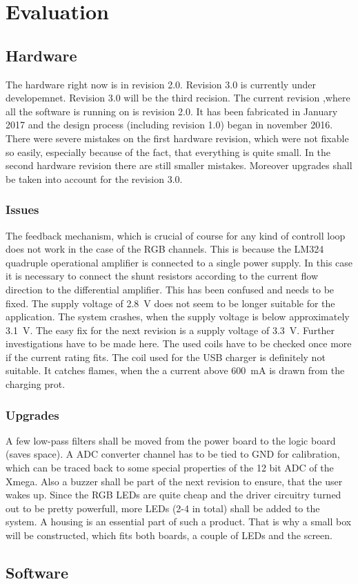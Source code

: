 \chapter{Evaluation}
\label{chap:evaluation}
\section{Hardware}
The hardware right now is in revision 2.0. Revision 3.0 is currently under
developemnet. Revision 3.0 will be the third recision. The current revision
,where all the software is running on is revision 2.0. It has been fabricated in
January 2017 and the design process (including revision 1.0) began in november
2016. There were severe mistakes on the first hardware revision, which were not
fixable so easily, especially because of the fact, that everything is quite
small. In the second hardware revision there are still smaller mistakes.
Moreover upgrades shall be taken into account for the revision 3.0. 

\subsection{Issues}
\label{subsec:issues}
The feedback mechanism, which is crucial of course for any kind of controll loop
does not work in the case of the RGB channels. This is because the LM324
quadruple operational amplifier is connected to a single power supply. In this
case it is necessary to connect the shunt resistors according to the current
flow direction to the differential amplifier. This has been confused and needs
to be fixed. 
\newpar
The supply voltage of \SI{2.8}{\volt} does not seem to be longer suitable for the
application. The system crashes, when the supply voltage is below approximately
\SI{3.1}{\volt}. The easy fix for the next revision is a supply voltage of
\SI{3.3}{V}. Further investigations have to be made here. 
\newpar
The used coils have to be checked once more if the current rating fits. The coil
used for the USB charger is definitely not suitable. It catches flames, when the a current above \SI{600}{\milli\ampere} is drawn from the charging prot. 

\subsection{Upgrades}
\label{subsec:upgrades}
A few low-pass filters shall be moved from the power board to the logic board
(saves space). 
\newpar
A ADC converter channel has to be tied to GND for calibration,
which can be traced back to some special properties of the 12 bit ADC of the
Xmega. 
\newpar
Also a buzzer shall be part of the next revision to ensure, that the user
wakes up.
\newpar
Since the RGB LEDs are quite cheap and the driver circuitry turned
out to be pretty powerfull, more LEDs (2-4 in total) shall be added to the system. 
\newpar
A housing is an essential part of such a product. That is why a small box will
be constructed, which fits both boards, a couple of LEDs and the screen. 

\section{Software}

